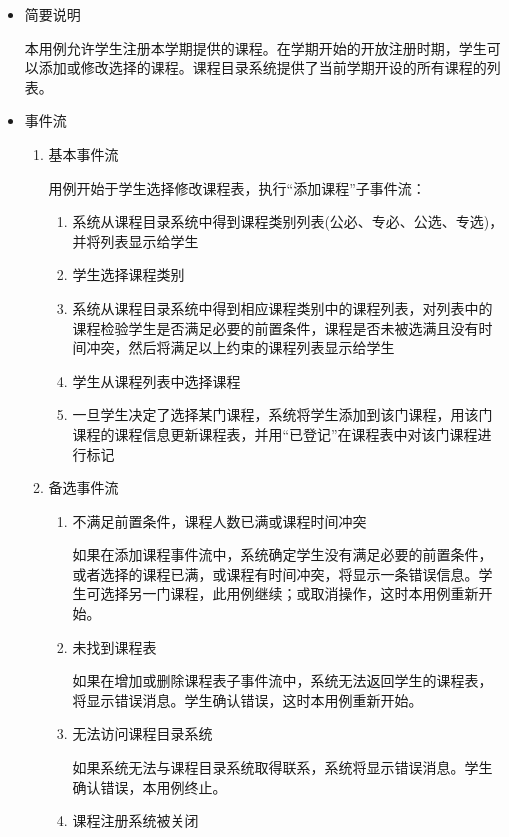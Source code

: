 \begin{itemize}
  \item 简要说明
  
  \CJKindent 本用例允许学生注册本学期提供的课程。在学期开始的开放注册时期，学生可以添加或修改选择的课程。课程目录系统提供了当前学期开设的所有课程的列表。
  
  \item 事件流
  \begin{enumerate}
    \item 基本事件流
    
    用例开始于学生选择修改课程表，执行“添加课程”子事件流：
    \begin{enumerate}[(1)]
      \item 系统从课程目录系统中得到课程类别列表(公必、专必、公选、专选)，并将列表显示给学生
      \item 学生选择课程类别
      \item 系统从课程目录系统中得到相应课程类别中的课程列表，对列表中的课程检验学生是否满足必要的前置条件，课程是否未被选满且没有时间冲突，然后将满足以上约束的课程列表显示给学生
      \item 学生从课程列表中选择课程
      \item 一旦学生决定了选择某门课程，系统将学生添加到该门课程，用该门课程的课程信息更新课程表，并用“已登记”在课程表中对该门课程进行标记
    \end{enumerate}

    \item 备选事件流
    \begin{enumerate}[{2}.1]
      \item 不满足前置条件，课程人数已满或课程时间冲突
      
      \CJKindent 如果在添加课程事件流中，系统确定学生没有满足必要的前置条件，或者选择的课程已满，或课程有时间冲突，将显示一条错误信息。学生可选择另一门课程，此用例继续；或取消操作，这时本用例重新开始。
      
      \item 未找到课程表
      
      \CJKindent 如果在增加或删除课程表子事件流中，系统无法返回学生的课程表，将显示错误消息。学生确认错误，这时本用例重新开始。
      
      \item 无法访问课程目录系统
      
      \CJKindent 如果系统无法与课程目录系统取得联系，系统将显示错误消息。学生确认错误，本用例终止。
      
      \item 课程注册系统被关闭
      

\end{enumerate}
\end{enumerate}
\end{itemize}
